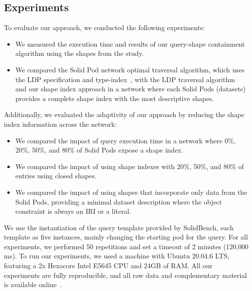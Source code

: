 \subsection{Experiments}
To evaluate our approach, we conducted the following experiments:
\begin{itemize}
   \item We measured the execution time and results of our query-shape containment algorithm using the shapes from the study.
   \item We compared the Solid Pod network optimal traversal algorithm, which uses the LDP specification and type-index~\cite{Taelman2023}, with the LDP traversal algorithm~\cite{Taelman2023} and our shape index approach in a network where each Solid Pods (datasets) provides a complete shape index with the most descriptive shapes.
\end{itemize}
Additionally, we evaluated the adaptivity of our approach by reducing the shape index information across the network:
\begin{itemize}
   \item We compared the impact of query execution time in a network where 0\%, 20\%, 50\%, and 80\% of Solid Pods expose a shape index.
   \item We compared the impact of using shape indexes with 20\%, 50\%, and 80\% of entries using closed shapes.
   \item We compared the impact of using shapes that incorporate only data from the Solid Pods, providing a minimal dataset description where the object constraint is always an IRI or a literal.
\end{itemize}
We use the instantiation of the query template provided by SolidBench, each template as five instances, mainly changing the starting pod for the query.
For all experiments, we performed 50 repetitions and set a timeout of 2 minutes (120,000 ms).
To run our experiments, we used a machine with Ubuntu 20.04.6 LTS, featuring a 2x Hexacore Intel E5645 CPU and 24GB of RAM.
All our experiments are fully reproducible, and all raw data and complementary material is available online~.


